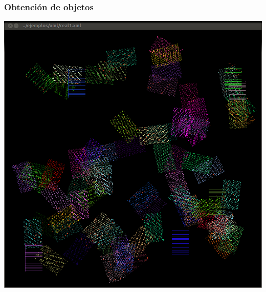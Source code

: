 \begin{frame}
    \frametitle{Obtención de objetos}
    \endblock{}
		\begin{center}
    \includegraphics[height=0.8\textheight]{FIGURES/real1-out}
		\end{center}
\end{frame}

